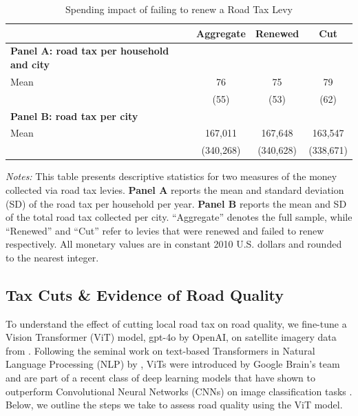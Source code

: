 
\begin{table}[ht]
    \centering
    \caption{Spending impact of failing to renew a Road Tax Levy}
    \label{tab:levy_stats}
    \begin{threeparttable}
    \begin{tabular}{p{5cm}ccc}
    \hline\hline
    & \textbf{Aggregate} & \textbf{Renewed} & \textbf{Cut} \\
    \hline
    \textbf{Panel A: road tax per household and city} \\
    Mean & 76 & 75 & 79 \\
       & (55) & (53) & (62) \\
    \hline
    \textbf{Panel B: road tax per city} \\
    Mean & 167,011 & 167,648 & 163,547 \\
       & (340,268) & (340,628) & (338,671) \\
    \hline\hline
    \end{tabular}
    \begin{tablenotes}[flushleft]
      \footnotesize
      \item \textit{Notes:} 
      This table presents descriptive statistics for two measures of the money collected via road tax levies. 
      \textbf{Panel A} reports the mean and standard deviation (SD) of the road tax per household per year. 
      \textbf{Panel B} reports the mean and SD of the total road tax collected per city. 
      “Aggregate” denotes the full sample, while “Renewed” and “Cut” refer to levies that were renewed and failed to renew respectively.
      All monetary values are in constant 2010 U.S. dollars and rounded to the nearest integer.
    \end{tablenotes}
    \end{threeparttable}
\end{table}





\subsection{Tax Cuts \& Evidence of Road Quality} \label{sec:road_quality}

To understand the effect of cutting local road tax on road quality, we fine-tune a Vision Transformer (ViT) model, gpt-4o by OpenAI, on satellite imagery data from \cite{brewer2021}. Following the seminal work on text-based Transformers in Natural Language Processing (NLP) by \cite{vaswani2017attention}, ViTs were introduced by Google Brain's team and are part of a recent class of deep learning models that have shown to outperform Convolutional Neural Networks (CNNs) on image classification tasks \citep{dosovitskiy2020image}. Below, we outline the steps we take to assess road quality using the ViT model.


